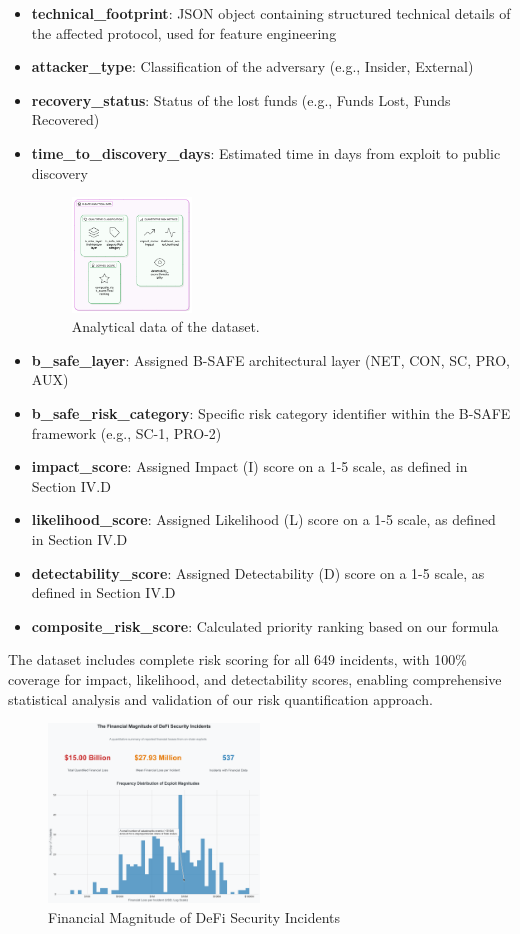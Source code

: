 \begin{itemize}
    \item \textbf{technical\_footprint}: JSON object containing structured technical details of the affected protocol, used for feature engineering
    \item \textbf{attacker\_type}: Classification of the adversary (e.g., Insider, External)
    \item \textbf{recovery\_status}: Status of the lost funds (e.g., Funds Lost, Funds Recovered)
    \item \textbf{time\_to\_discovery\_days}: Estimated time in days from exploit to public discovery
    \begin{figure}[H]
        \centering
        \includegraphics[width=0.3\textwidth]{../figure/methodology/analytical_data.jpg}
        \caption{Analytical data of the dataset.}
        \label{fig:analytical_data}
    \end{figure}
    \item \textbf{b\_safe\_layer}: Assigned B-SAFE architectural layer (NET, CON, SC, PRO, AUX)
    \item \textbf{b\_safe\_risk\_category}: Specific risk category identifier within the B-SAFE framework (e.g., SC-1, PRO-2)
    \item \textbf{impact\_score}: Assigned Impact (I) score on a 1-5 scale, as defined in Section IV.D
    \item \textbf{likelihood\_score}: Assigned Likelihood (L) score on a 1-5 scale, as defined in Section IV.D
    \item \textbf{detectability\_score}: Assigned Detectability (D) score on a 1-5 scale, as defined in Section IV.D
    \item \textbf{composite\_risk\_score}: Calculated priority ranking based on our formula
\end{itemize}

The dataset includes complete risk scoring for all 649 incidents, with 100\% coverage for impact, likelihood, and detectability scores, enabling comprehensive statistical analysis and validation of our risk quantification approach.

\begin{figure}[H]
\centering
\includegraphics[width=0.5\textwidth]{../figure/methodology/fig4.png}
\caption{Financial Magnitude of DeFi Security Incidents}
\label{fig:data_pipeline}
\end{figure}
